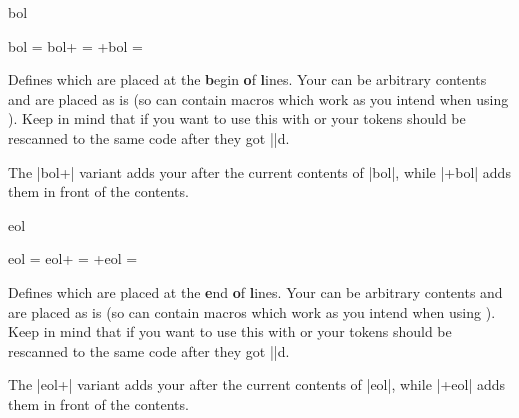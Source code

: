 \begin{function}{bol}
  \begin{syntax}
    bol = 
    bol+ = 
    +bol = 
  \end{syntax}
  Defines which  are placed at the \textbf{b}egin \textbf{o}f
  \textbf{l}ines. Your  can be arbitrary contents and are placed as
  is (so can contain macros which work as you intend when using
  ). Keep in mind that if you want to use this with
   or  your tokens should be rescanned to
  the same code after they got |\detokenize|d.\par
  The |bol+| variant adds your  after the current contents of
  |bol|, while |+bol| adds them in front of the contents.
\end{function}

\begin{function}{eol}
  \begin{syntax}
    eol = 
    eol+ = 
    +eol = 
  \end{syntax}
  Defines which  are placed at the \textbf{e}nd \textbf{o}f
  \textbf{l}ines. Your  can be arbitrary contents and are placed as
  is (so can contain macros which work as you intend when using
  ). Keep in mind that if you want to use this with
   or  your tokens should be rescanned to
  the same code after they got |\detokenize|d.\par
  The |eol+| variant adds your  after the current contents of
  |eol|, while |+eol| adds them in front of the contents.
\end{function}


